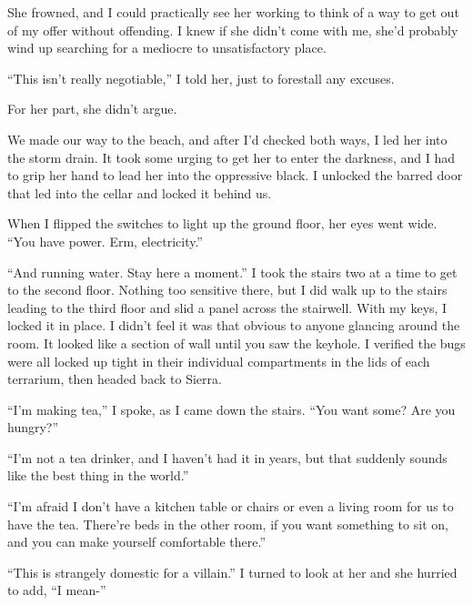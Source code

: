 She frowned, and I could practically see her working to think of a way to get out of my offer without offending.  I knew if she didn't come with me, she'd probably wind up searching for a mediocre to unsatisfactory place.



``This isn't really negotiable,'' I told her, just to forestall any excuses.



For her part, she didn't argue.



We made our way to the beach, and after I'd checked both ways, I led her into the storm drain.  It took some urging to get her to enter the darkness, and I had to grip her hand to lead her into the oppressive black.  I unlocked the barred door that led into the cellar and locked it behind us.



When I flipped the switches to light up the ground floor, her eyes went wide.  ``You have power.  Erm, electricity.''



``And running water.  Stay here a moment.''  I took the stairs two at a time to get to the second floor.  Nothing too sensitive there, but I did walk up to the stairs leading to the third floor and slid a panel across the stairwell.  With my keys, I locked it in place.  I didn't feel it was that obvious to anyone glancing around the room.  It looked like a section of wall until you saw the keyhole.  I verified the bugs were all locked up tight in their individual compartments in the lids of each terrarium, then headed back to Sierra.



``I'm making tea,'' I spoke, as I came down the stairs.  ``You want some?  Are you hungry?''



``I'm not a tea drinker, and I haven't had it in years, but that suddenly sounds like the best thing in the world.''



``I'm afraid I don't have a kitchen table or chairs or even a living room for us to have the tea.  There're beds in the other room, if you want something to sit on, and you can make yourself comfortable there.''



``This is strangely domestic for a villain.''  I turned to look at her and she hurried to add, ``I mean-''



